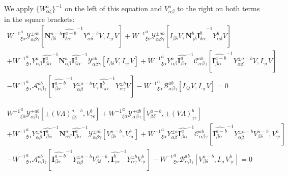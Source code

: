 \documentclass{Note}
\begin{document}
We apply $\{{W_{\alpha\xi}^a}\}^{-1}$ on the left of this equation and $V_{\alpha\beta}^a$ to the right on both terms in the square brackets:
\begin{equation}
\begin{aligned}
{W^{-1}}_{\xi\alpha}^a \mathcal{Y}_{\alpha\beta\gamma}^{\pm ab}[\textbf{N}_{\beta\delta}^{a-b} {\widehat{\textbf{I}_{\delta \alpha}^{a-b}}}^{-1}  Y_{\alpha\delta}^{a-b}V ,I_{\gamma\epsilon}V ]+{W^{-1}}_{\xi\alpha}^a  \mathcal{Y}_{\alpha\beta\gamma}^{\pm ab}[I_{\beta\delta}V,\textbf{N}_{\gamma\delta}^{b} {\widehat{\textbf{I}_{\delta \alpha}^{b}}}^{-1}  Y_{\alpha\delta}^{b} V]\\
+{W^{-1}}_{\xi\alpha}^a  Y_{\alpha\beta}^{a} {\widehat{\textbf{I}_{\beta \alpha}^a}}^{-1}   \textbf{N}_{\alpha\beta}^a {\widehat{\textbf{I}_{\beta \alpha}^a}}^{-1} \mathcal{Y}_{\alpha\beta\gamma}^{ab}[I_{\beta\delta}V,I_{\gamma\epsilon} V]+{W^{-1}}_{\xi\alpha}^a Y_{\alpha\beta}^{a}{\widehat{\textbf{I}_{\beta \alpha}^a}}^{-1}  \mathcal{C}_{\alpha\beta\gamma}^{ab}[{\widehat{\textbf{I}_{\beta \alpha}^{a-b}}}^{-1}  Y_{\alpha\beta}^{\pm a-b}  V,I_{\gamma\epsilon} V]\\
-{W^{-1}}_{\xi\alpha}^a \mathcal{A}_{\alpha\beta\gamma}^{ab}[{\widehat{\textbf{I}_{\beta \alpha}^{a-b}}}^{-1}  Y_{\alpha\beta}^{\pm a-b}V ,{\widehat{\textbf{I}_{\gamma \alpha}^{b}}}^{-1}  Y_{\alpha\gamma}^{\pm b} V] -{W^{-1}}_{\xi\alpha}^a \mathcal{B}_{\alpha\beta\gamma}^{ab}[I_{\beta\delta}V,I_{\gamma\epsilon}V ]=0
\end{aligned}
\end{equation}

\begin{equation}
\begin{aligned}
{W^{-1}}_{\xi\alpha}^a \mathcal{Y}_{\alpha\beta\gamma}^{\pm ab}[\pm {(V\Lambda)}_{\beta\delta}^{a-b} ,V_{\gamma\epsilon} ^{b}]+{W^{-1}}_{\xi\alpha}^a  \mathcal{Y}_{\alpha\beta\gamma}^{\pm ab}[V_{\beta\delta}^{a-b},\pm {(V\Lambda)}_{\gamma\epsilon}^{b}]\\
+{W^{-1}}_{\xi\alpha}^a  Y_{\alpha\beta}^{\pm a} {\widehat{\textbf{I}_{\beta \alpha}^a}}^{-1}   \textbf{N}_{\alpha\beta}^a {\widehat{\textbf{I}_{\beta \alpha}^a}}^{-1} \mathcal{Y}_{\alpha\beta\gamma}^{\pm ab}[V_{\beta\delta}^{a-b},V_{\gamma\epsilon}^{b}]+{W^{-1}}_{\xi\alpha}^a Y_{\alpha\beta}^{\pm a}{\widehat{\textbf{I}_{\beta \alpha}^a}}^{-1}  \mathcal{C}_{\alpha\beta\gamma}^{ab}[{\widehat{\textbf{I}_{\beta \alpha}^{a-b}}}^{-1}  Y_{\alpha\beta}^{\pm a-b} V_{\beta\delta}^{a-b}, V_{\gamma\epsilon}^{b} ]\\
-{W^{-1}}_{\xi\alpha}^a \mathcal{A}_{\alpha\beta\gamma}^{ab}[{\widehat{\textbf{I}_{\beta \alpha}^{a-b}}}^{-1}  Y_{\alpha\beta}^{\pm a-b}V_{\beta\delta}^{a-b} ,{\widehat{\textbf{I}_{\gamma \alpha}^{b}}}^{-1}  Y_{\alpha\gamma}^{\pm b} V_{\gamma\epsilon}^{b}] -{W^{-1}}_{\xi\alpha}^a \mathcal{B}_{\alpha\beta\gamma}^{ab}[V_{\beta\delta}^{a-b} ,I_{\gamma\epsilon}V_{\gamma\epsilon}^{b} ]=0
\end{aligned}
\end{equation}
\end{document}
